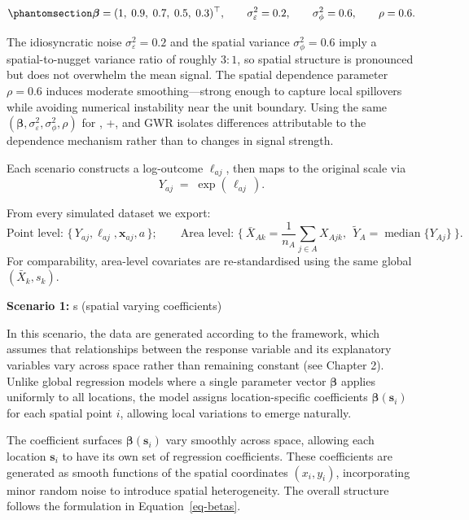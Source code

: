 \documentclass[
  letterpaper,
  DIV=11,
  numbers=noendperiod]{scrartcl}
\begin{document}
\begin{equation}\phantomsection\label{eq-params}{
\boldsymbol{\beta}=(1,\;0.9,\;0.7,\;0.5,\;0.3)^\top,\qquad
\sigma_\varepsilon^2=0.2,\qquad
\sigma_\phi^2=0.6,\qquad
\rho=0.6 .
}\end{equation}

The idiosyncratic noise \(\sigma_\varepsilon^2 = 0.2\) and the spatial
variance \(\sigma_\phi^2 = 0.6\) imply a spatial-to-nugget variance
ratio of roughly \(3{:}1\), so spatial structure is pronounced but does
not overwhelm the mean signal. The spatial dependence parameter
\(\rho = 0.6\) induces moderate smoothing---strong enough to capture
local spillovers while avoiding numerical instability near the unit
boundary. Using the same
\((\boldsymbol{\beta},\sigma_\varepsilon^2,\sigma_\phi^2,\rho)\) for
, +, and GWR isolates differences
attributable to the dependence mechanism rather than to changes in
signal strength.

Each scenario constructs a log-outcome \(\ell_{aj}\), then maps to the
original scale via \[
Y_{aj} \;=\; \exp(\,\ell_{aj}\,).
\]

From every simulated dataset we export: \[
\text{Point level: }\{\,Y_{aj},\ell_{aj},\mathbf x_{aj},a\,\}; \qquad
\text{Area level: } \Big\{\ \bar X_{Ak}=\frac{1}{n_A}\sum_{j\in A}X_{Ajk},\ \ \tilde Y_A=\operatorname{median}\{Y_{Aj}\}\ \Big\}.
\] For comparability, area-level covariates are re-standardised using
the same global \((\bar X_k,s_k)\).

\textbf{Scenario 1:}  s (spatial varying coefficients)

In this scenario, the data are generated according to the 
framework, which assumes that relationships between the response
variable and its explanatory variables vary across space rather than
remaining constant (see Chapter 2). Unlike global regression models
where a single parameter vector \(\boldsymbol{\beta}\) applies uniformly
to all locations, the  model assigns location-specific
coefficients \(\boldsymbol{\beta}(\mathbf{s}_i)\) for each spatial point
\(i\), allowing local variations to emerge naturally.

The coefficient surfaces \(\boldsymbol{\beta}(\mathbf{s}_i)\) vary
smoothly across space, allowing each location \(\mathbf{s}_i\) to have
its own set of regression coefficients. These coefficients are generated
as smooth functions of the spatial coordinates \((x_i, y_i)\),
incorporating minor random noise to introduce spatial heterogeneity. The
overall structure follows the formulation in Equation~\ref{eq-betas}.
\end{document}
